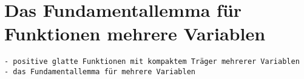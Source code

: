 %
%
%
\section{Das Fundamentallemma für Funktionen mehrere Variablen
\label{buch:felder:section:fundamentallemma}}

\begin{verbatim}
- positive glatte Funktionen mit kompaktem Träger mehrerer Variablen
- das Fundamentallemma für mehrere Variablen
\end{verbatim}
